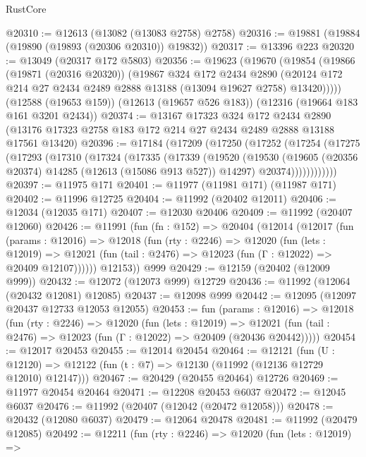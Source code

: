 \begin{lexlean}{RustCore}
\begin{coremodule}
@20310 := @12613 (@13082 (@13083 @2758) @2758)
@20316 := @19881 (@19884 (@19890 (@19893 (@20306 @20310)) @19832))
@20317 := @13396 @223
@20320 := @13049 (@20317 @172 @5803)
@20356 := @19623
    (@19670
      (@19854
        (@19866
          (@19871 (@20316 @20320))
          (@19867
            @324
            @172
            @2434
            @2890
            (@20124 @172 @214 @27 @2434 @2489 @2888 @13188 (@13094 @19627 @2758) @13420)))))
    (@12588 (@19653 @159))
    (@12613 (@19657 @526 @183))
    (@12316 (@19664 @183 @161 @3201 @2434))
@20374 := @13167
    @17323
    @324
    @172
    @2434
    @2890
    (@13176 @17323 @2758 @183 @172 @214 @27 @2434 @2489 @2888 @13188 @17561 @13420)
@20396 := @17184
    (@17209
      (@17250
        (@17252
          (@17254
            (@17275
              (@17293
                (@17310
                  (@17324
                    (@17335
                      (@17339
                        (@19520
                          (@19530
                            (@19605 (@20356 @20374) @14285 (@12613 (@15086 @913 @527)) @14297)
                            @20374))))))))))))
@20397 := @11975 @171
@20401 := @11977 (@11981 @171) (@11987 @171)
@20402 := @11996 @12725
@20404 := @11992 (@20402 @12011)
@20406 := @12034 (@12035 @171)
@20407 := @12030 @20406
@20409 := @11992 (@20407 @12060)
@20426 := @11991
    (fun (fn : @152) =>
    @20404
      (@12014
        (@12017
          (fun (params : @12016) =>
          @12018
            (fun (rty : @2246) =>
            @12020
              (fun (lets : @12019) =>
              @12021 (fun (tail : @2476) => @12023 (fun (Γ : @12022) => @20409 @12107))))))
        @12153))
    @999
@20429 := @12159 (@20402 (@12009 @999))
@20432 := @12072 (@12073 @999) @12729
@20436 := @11992 (@12064 (@20432 @12081) @12085)
@20437 := @12098 @999
@20442 := @12095 (@12097 @20437 @12733 @12053 @12055)
@20453 := fun (params : @12016) =>
  @12018
    (fun (rty : @2246) =>
    @12020
      (fun (lets : @12019) =>
      @12021 (fun (tail : @2476) => @12023 (fun (Γ : @12022) => @20409 (@20436 @20442)))))
@20454 := @12017 @20453
@20455 := @12014 @20454
@20464 := @12121
    (fun (U : @12120) => @12122 (fun (t : @7) => @12130 (@11992 (@12136 @12729 @12010) @12147)))
@20467 := @20429 (@20455 @20464) @12726
@20469 := @11977 @20454 @20464
@20471 := @12208 @20453 @6037
@20472 := @12045 @6037
@20476 := @11992 (@20407 (@12042 (@20472 @12058)))
@20478 := @20432 (@12080 @6037)
@20479 := @12064 @20478
@20481 := @11992 (@20479 @12085)
@20492 := @12211
    (fun (rty : @2246) =>
    @12020
      (fun (lets : @12019) =>

\end{coremodule}
\end{lexlean}
